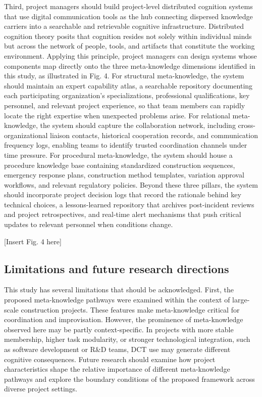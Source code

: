 \documentclass[authoryear,preprint,review,times,10pt]{elsarticle}
\begin{document}
Third, project managers should build project-level distributed cognition systems that use digital communication tools as the hub connecting dispersed knowledge carriers into a searchable and retrievable cognitive infrastructure. Distributed cognition theory posits that cognition resides not solely within individual minds but across the network of people, tools, and artifacts that constitute the working environment. Applying this principle, project managers can design systems whose components map directly onto the three meta-knowledge dimensions identified in this study, as illustrated in Fig. 4. For structural meta-knowledge, the system should maintain an expert capability atlas, a searchable repository documenting each participating organization's specializations, professional qualifications, key personnel, and relevant project experience, so that team members can rapidly locate the right expertise when unexpected problems arise. For relational meta-knowledge, the system should capture the collaboration network, including cross-organizational liaison contacts, historical cooperation records, and communication frequency logs, enabling teams to identify trusted coordination channels under time pressure. For procedural meta-knowledge, the system should house a procedure knowledge base containing standardized construction sequences, emergency response plans, construction method templates, variation approval workflows, and relevant regulatory policies. Beyond these three pillars, the system should incorporate project decision logs that record the rationale behind key technical choices, a lessons-learned repository that archives post-incident reviews and project retrospectives, and real-time alert mechanisms that push critical updates to relevant personnel when conditions change.

\begin{center}[Insert Fig. 4 here]\end{center}

\subsection{Limitations and future research directions}
This study has several limitations that should be acknowledged. First, the proposed meta-knowledge pathways were examined within the context of large-scale construction projects. These features make meta-knowledge critical for coordination and improvisation. However, the prominence of meta-knowledge observed here may be partly context-specific. In projects with more stable membership, higher task modularity, or stronger technological integration, such as software development or R\&D teams, DCT use may generate different cognitive consequences. Future research should examine how project characteristics shape the relative importance of different meta-knowledge pathways and explore the boundary conditions of the proposed framework across diverse project settings.
\end{document}
